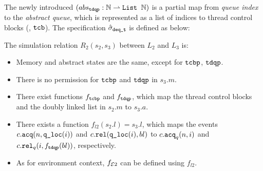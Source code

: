 {The newly introduced $(abs_\comm{tdqp}: \integer \partf 
\comm{List\ }\integer)$ is a partial map from \emph{queue index}
to the \emph{abstract queue}, which is represented as
a list of indices to thread control blocks (\ie, $\comm{tcb}$).
The specification $\spec_{\deq\comm{\_t}}$ is defined as below:
\begin{mathpar}
\end{mathpar}
The  simulation relation 
$R_{2} (s_2, s_3)$ between $L_2$ and $L_3$
is:
\vspace{-5pt}
\begin{itemize}
\itemsep0em
\item Memory and abstract states are the same, except for $\comm{tcbp}$,  $\comm{tdqp}$.
\item There is no permission for $\comm{tcbp}$
and $\comm{tdqp}$ in $s_3.m$.
\item There exist functions $f_\comm{tcbp}$
and $f_\comm{tdqp}$, which map the thread control blocks and the doubly linked list in $s_2.m$ to $s_3.a$.
\item There exists a function  $f_{l2}(s_2.l) = s_3.l$,
which maps the events $c.\acq(n,\qloc(i))$ and $c.\rel(\qloc(i), bl)$
to $c.\acq_q(n,i)$ and $c.\rel_q (i, f_\comm{tdqp}(bl))$,
respectively.
\item  As for environment context,  $f_{\oracle 2}$  can be defined using $f_{l2}$.
\end{itemize}

}
